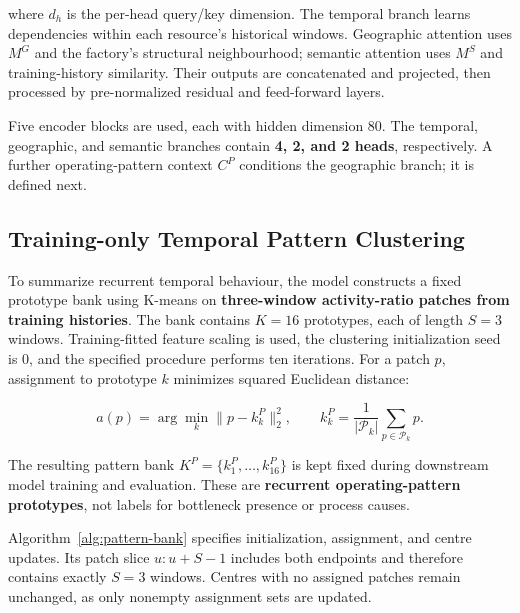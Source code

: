 where \(d_h\) is the per-head query/key dimension. The temporal branch learns dependencies within each resource's historical windows. Geographic attention uses \(M^G\) and the factory's structural neighbourhood; semantic attention uses \(M^S\) and training-history similarity. Their outputs are concatenated and projected, then processed by pre-normalized residual and feed-forward layers.

Five encoder blocks are used, each with hidden dimension \(80\). The temporal, geographic, and semantic branches contain \textbf{4, 2, and 2 heads}, respectively. A further operating-pattern context \(C^P\) conditions the geographic branch; it is defined next.

\subsection{Training-only Temporal Pattern Clustering}\label{training-only-temporal-pattern-clustering}

To summarize recurrent temporal behaviour, the model constructs a fixed prototype bank using K-means on \textbf{three-window activity-ratio patches from training histories}. The bank contains \(K=16\) prototypes, each of length \(S=3\) windows. Training-fitted feature scaling is used, the clustering initialization seed is \(0\), and the specified procedure performs ten iterations. For a patch \(p\), assignment to prototype \(k\) minimizes squared Euclidean distance:

\[
a(p)=\arg\min_{k}\lVert p-k_k^P\rVert_2^2,
\qquad
k_k^P=\frac{1}{|\mathcal{P}_k|}\sum_{p\in\mathcal{P}_k}p.
\]

The resulting pattern bank \(K^P=\{k_1^P,\dots,k_{16}^P\}\) is kept fixed during downstream model training and evaluation. These are \textbf{recurrent operating-pattern prototypes}, not labels for bottleneck presence or process causes.

Algorithm~\ref{alg:pattern-bank} specifies initialization, assignment, and centre updates. Its patch slice \(u:u+S-1\) includes both endpoints and therefore contains exactly \(S=3\) windows. Centres with no assigned patches remain unchanged, as only nonempty assignment sets are updated.

